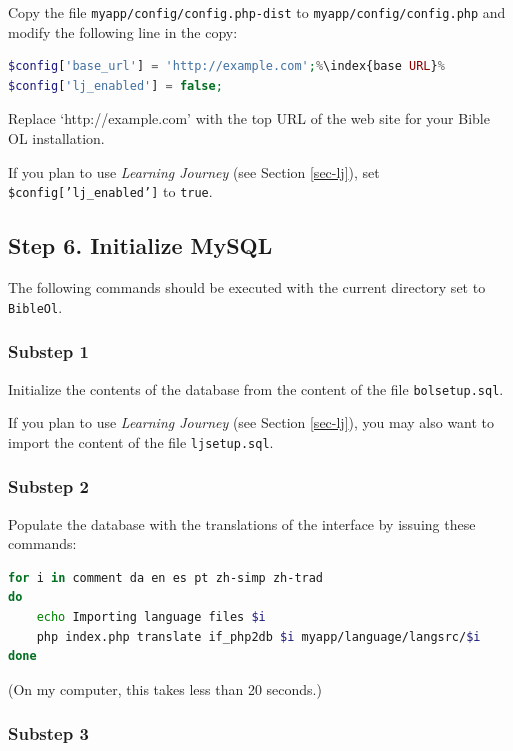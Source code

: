 \documentclass[11pt,oneside,a4paper]{memoir}
\begin{document}
Copy the file \texttt{myapp/config/config.php-dist} to \texttt{myapp/config/config.php} and modify the
following line in the copy:

\begin{lstlisting}[language=PHP]
$config['base_url'] = 'http://example.com';%\index{base URL}%
$config['lj_enabled'] = false;
\end{lstlisting}

Replace `http://example.com' with the top URL of the web site for your Bible OL installation.

If you plan to use \emph{Learning Journey} (see Section \ref{sec-lj}), set \texttt{\$config['lj\_enabled']} to \texttt{true}.


\subsection{Step 6. Initialize MySQL}

The following commands should be executed with the current directory set to \texttt{BibleOl}.

\subsubsection*{Substep 1}

Initialize the contents of the database from the content of the file \texttt{bolsetup.sql}.

If you plan to use \emph{Learning Journey} (see Section \ref{sec-lj}), you may also want to import
the content of the file \texttt{ljsetup.sql}.


\subsubsection*{Substep 2}

Populate the database with the translations of the interface by issuing these commands:

\begin{lstlisting}[language=bash]
for i in comment da en es pt zh-simp zh-trad
do
    echo Importing language files $i
    php index.php translate if_php2db $i myapp/language/langsrc/$i
done
\end{lstlisting}

(On my computer, this takes less than 20 seconds.)

\subsubsection*{Substep 3}
\end{document}
